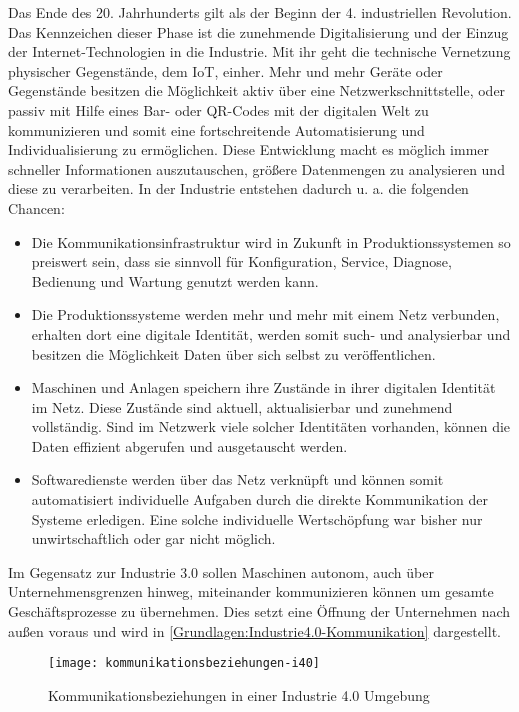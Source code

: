 Das Ende des 20. Jahrhunderts gilt als der Beginn der 4. industriellen Revolution. Das Kennzeichen dieser Phase ist die zunehmende Digitalisierung und der Einzug der Internet-Technologien in die Industrie. Mit ihr geht die technische Vernetzung physischer Gegenstände, dem \ac{IoT}, einher. Mehr und mehr Geräte oder Gegenstände besitzen die Möglichkeit aktiv über eine Netzwerkschnittstelle, oder passiv mit Hilfe eines Bar- oder QR-Codes mit der digitalen Welt zu kommunizieren und somit eine fortschreitende Automatisierung und Individualisierung zu ermöglichen. Diese Entwicklung macht es möglich immer schneller Informationen auszutauschen, größere Datenmengen zu analysieren und diese zu verarbeiten. In der Industrie entstehen dadurch u. a. die folgenden Chancen:

\begin{itemize}
  \item Die Kommunikationsinfrastruktur wird in Zukunft in Produktionssystemen so preiswert sein, dass sie sinnvoll für Konfiguration, Service, Diagnose, Bedienung und Wartung genutzt werden kann.
  \item Die Produktionssysteme werden mehr und mehr mit einem Netz verbunden, erhalten dort eine digitale Identität, werden somit such- und analysierbar und besitzen die Möglichkeit Daten über sich selbst zu veröffentlichen. 
  \item Maschinen und Anlagen speichern ihre Zustände in ihrer digitalen Identität im Netz. Diese Zustände sind aktuell, aktualisierbar und zunehmend vollständig. Sind im Netzwerk viele solcher Identitäten vorhanden, können die Daten effizient abgerufen und ausgetauscht werden.
  \item Softwaredienste werden über das Netz verknüpft und können somit automatisiert individuelle Aufgaben durch die direkte Kommunikation der Systeme erledigen. Eine solche individuelle Wertschöpfung war bisher nur unwirtschaftlich oder gar nicht möglich.
\end{itemize}

Im Gegensatz zur Industrie 3.0 sollen Maschinen autonom, auch über Unternehmensgrenzen hinweg, miteinander kommunizieren können um gesamte Geschäftsprozesse zu übernehmen. Dies setzt eine Öffnung der Unternehmen nach außen voraus und wird in \autoref{Grundlagen:Industrie4.0-Kommunikation} dargestellt.

\begin{figure}[h]
  \centering
  \texttt{[image: kommunikationsbeziehungen-i40]}
  \caption{Kommunikationsbeziehungen in einer Industrie 4.0 Umgebung}
  \label{Grundlagen:Industrie4.0-Kommunikation}
\end{figure}

